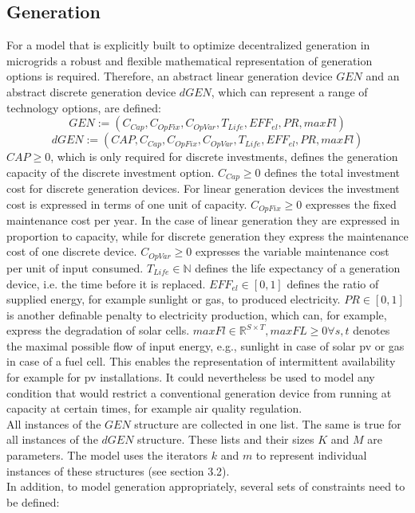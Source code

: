 \documentclass[
	11pt,								%
	DIV10,								%
	a4paper,         					%
	oneside,							%
	headheight=20pt,					%
	footheight=20pt,					%
    parskip=full,						%
    listof=totoc,						%
	bibliography=totoc,					%
	index=totoc,						%
]{scrartcl}
\begin{document}
\subsection{Generation}
For a model that is explicitly built to optimize decentralized generation in microgrids a robust and flexible mathematical representation of generation options is required.
Therefore, an abstract linear generation device $GEN$ and an abstract discrete generation device $dGEN$, which can represent a range of technology options, are defined:\\
	\begin{equation}
		GEN := (C_{Cap}, C_{OpFix}, C_{OpVar}, T_{Life}, EFF_{el}, PR, maxFl)
	\end{equation}
	\begin{equation}
		dGEN := (CAP, C_{Cap}, C_{OpFix}, C_{OpVar}, T_{Life}, EFF_{el}, PR, maxFl)
	\end{equation}
	$CAP \geq 0$, which is only required for discrete investments, defines the generation capacity of the discrete investment option.
	$C_{Cap} \geq 0$ defines the total investment cost for discrete generation devices. For linear generation devices the investment cost is expressed in terms of one unit of capacity.
	$C_{OpFix} \geq 0$ expresses the fixed maintenance cost per year. In the case of linear generation they are expressed in proportion to capacity, while for discrete generation they express the maintenance cost of one discrete device.
	$C_{OpVar} \geq 0$ expresses the variable maintenance cost per unit of input consumed.
	$T_{Life} \in \mathbb{N}$ defines the life expectancy of a generation device, i.e. the time before it is replaced. 
	$EFF_{el} \in [0,1]$ defines the ratio of supplied energy, for example sunlight or gas, to produced electricity.
	$PR \in [0,1]$ is another definable penalty to electricity production, which can, for example, express the degradation of solar cells. 	
	$maxFl \in \mathbb{R}^{S \times T}, maxFL \geq 0 \forall s,t$ denotes the maximal possible flow of input energy, e.g., sunlight in case of solar pv or gas in case of a fuel cell. This enables the representation of intermittent availability for example for pv installations. It could nevertheless be used to model any condition that would restrict a conventional generation device from running at capacity at certain times, for example air quality regulation.  \\
	All instances of the $GEN$ structure are collected in one list. The same is true for all instances of the $dGEN$ structure. These lists and their sizes $K$ and $M$ are parameters. The model uses the iterators $k$ and $m$ to represent individual instances of these structures (see section 3.2).
	\\
	In addition, to model generation appropriately, several sets of constraints need to be defined:
	
\end{document}
